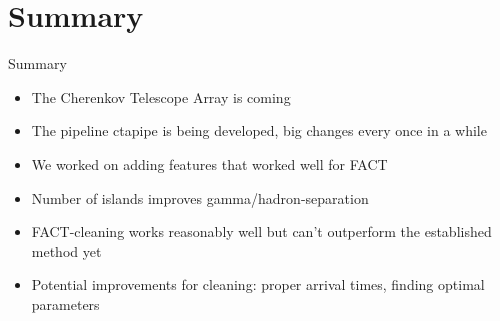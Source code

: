 \section{Summary}

\begin{frame}{Summary}
	\begin{itemize}
		\item The Cherenkov Telescope Array is coming
		\item The pipeline ctapipe is being developed, big changes every once in a while
		\item We worked on adding features that worked well for FACT
		\item Number of islands improves gamma/hadron-separation
		\item FACT-cleaning works reasonably well but can't outperform the established method yet
		\item Potential improvements for cleaning: proper arrival times, finding optimal parameters
	\end{itemize}
\end{frame}
